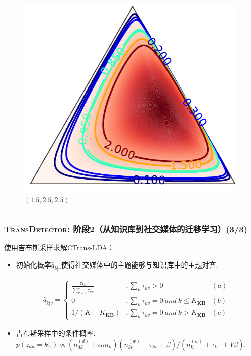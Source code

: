 \begin{frame}
\begin{columns}
\begin{column}{0.48\paperwidth}
	\begin{figure}
		\caption{$(1.5,2.5,2.5)$}
		\includegraphics[width=0.4\paperwidth]{img/croppedDirichletGraph10.pdf}	
	\end{figure}	
\end{column}	
\end{columns}

\end{frame}


\begin{frame}
\frametitle{\textsc{TransDetector}: 阶段2（从知识库到社交媒体的迁移学习）(3/3)}	
使用吉布斯采样求解CTrans-LDA：
\begin{itemize}
	\item 初始化概率\(\hat{q}_{k|v}\)使得社交媒体中的主题能够与知识库中的主题对齐.
\setlength{\abovedisplayskip}{0pt}
\setlength{\belowdisplayskip}{0pt}
\begin{scriptsize} 
\begin{equation}
\label{eq:initProbability}
\begin{aligned}
\hat{q}_{k|v}=
\left\{ \begin{aligned}
\frac{\tau_{kv}}{\sum_{k=1}^{K}\tau_{kv}} &,\sum_{k}\tau_{kv}>0 & (a)\\
0&, \sum_{k}\tau_{kv}=0 \ and \ k \leq K_{\bm{KB}} & (b)\\
1/(K-K_{\bm{KB}})&,\sum_{k}\tau_{kv}=0 \ and \ k > K_{\bm{KB}} & (c)
\end{aligned}\right.
\end{aligned}
\end{equation}
\end{scriptsize}
\item 吉布斯采样中的条件概率.
\(p(z_{dn}=k|.)\propto (n^{(d)}_{dk}+\alpha m_k)(n^{(w)}_{kv}+\tau_{kv}+\beta)/(n^{(w)}_{k,.}+\tau_{k,.}+V\beta)\).
\end{itemize}

\end{frame}




